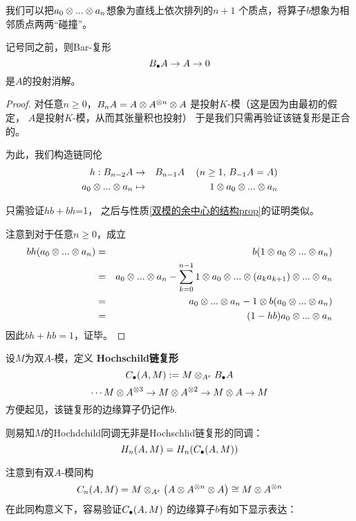 我们可以把$a_0\otimes...\otimes a_n$想象为直线上依次排列的$n+1$
个质点，将算子$b$想象为相邻质点两两“碰撞”。

\begin{prop}记号同之前，则Bar-复形
$$B_{\bullet} A\to A\to 0$$
是$A$的投射消解。
\end{prop}

\begin{proof}
对任意$n\geq0$，$B_nA=A\otimes A^{\otimes n}\otimes A$
是投射$K$-模（这是因为由最初的假定，
$A$是投射$K$-模，从而其张量积也投射）
于是我们只需再验证该链复形是正合的。

为此，我们构造链同伦
\begin{eqnarray*}
h:B_{n-2}A&\to& B_{n-1}A
\,\,\,\,\,\,\,(n\geq1,\,B_{-1}A=A)\\
a_0\otimes...\otimes a_n
&\mapsto&
1\otimes a_0\otimes...\otimes a_n
\end{eqnarray*}

只需验证$hb+bh$=1，
之后与性质\ref{双模的余中心的结构prop}的证明类似。

注意到对于任意$n\geq 0$，成立
\begin{eqnarray*}
    bh(a_0\otimes...\otimes a_n)
&=& b(1\otimes a_0\otimes...\otimes a_n)\\
&=& a_0\otimes...\otimes a_n-
    \sum_{k=0}^{n-1}
        1\otimes a_0\otimes...\otimes(a_ka_{k+1})\otimes...\otimes a_n\\
&=& a_0\otimes...\otimes a_n-
    1\otimes b(a_0\otimes...\otimes a_n)\\
&=&(1-hb)a_0\otimes...\otimes a_n
\end{eqnarray*}
因此$bh+hb=1$，证毕。
\end{proof}

\begin{definition}
设$M$为双$A$-模，定义
\textbf{Hochschild链复形}
\label{Hochschild链复形-def}
$$C_{\bullet}(A,M):=M\otimes_{A^e} B_{\bullet} A$$
$$\cdots M\otimes A^{\otimes 3}\to M\otimes A^{\otimes 2}\to M\otimes A\to M$$
方便起见，该链复形的边缘算子仍记作$b$.
\end{definition}

则易知$M$的Hochdchild同调无非是Hochschlid链复形的同调：
$$H_n(A,M)=H_n(C_{\bullet}(A,M))$$

注意到有双$A$-模同构
$$C_n(A,M)=M\otimes_{A^e}
\left(A\otimes A^{\otimes n}\otimes A\right)
\cong M\otimes A^{\otimes n}$$
在此同构意义下，容易验证$C_{\bullet}(A,M)$
的边缘算子$b$有如下显示表达：

